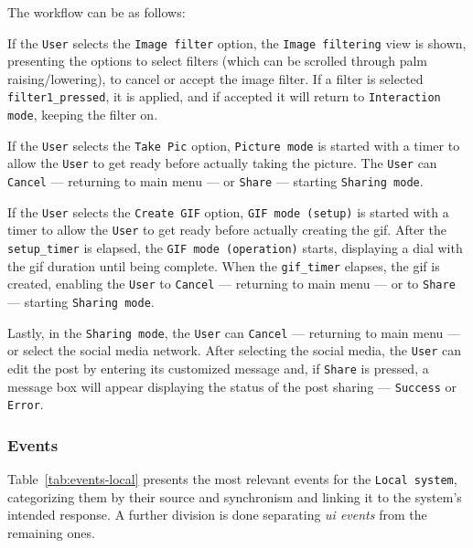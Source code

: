 The workflow can be as follows:
\begin{item-c}
\item If the \texttt{User} selects the \texttt{Image filter} option, the
  \texttt{Image filtering} view is shown, presenting the options to select
  filters (which can be scrolled through palm raising/lowering), to cancel or
  accept the image filter. If a filter is selected \texttt{filter1\_pressed}, it
  is applied, and if accepted it will return to \texttt{Interaction mode},
  keeping the filter on.
\item If the \texttt{User} selects the \texttt{Take Pic} option, \texttt{Picture
  mode} is started with a timer to allow the \texttt{User} to get ready before
actually taking the picture. The \texttt{User} can \texttt{Cancel} --- returning
to main menu --- or \texttt{Share} --- starting \texttt{Sharing mode}.
\item If the \texttt{User} selects the \texttt{Create GIF} option, \texttt{GIF
    mode (setup)} is started with a timer to allow the \texttt{User} to get
  ready before actually creating the \gls{gif}. After the \texttt{setup\_timer}
  is elapsed, the \texttt{GIF mode (operation)} starts, displaying a dial with
  the \gls{gif} duration until being complete. When the \texttt{gif\_timer}
  elapses, the \gls{gif} is created, enabling the \texttt{User} to
  \texttt{Cancel} --- returning to main menu --- or to \texttt{Share} ---
  starting \texttt{Sharing mode}.
\item Lastly, in the \texttt{Sharing mode}, the \texttt{User} can
  \texttt{Cancel} --- returning to main menu --- or select the
  social media network. After selecting the social media, the \texttt{User} can
  edit the post by entering its customized message and, if \texttt{Share} is
  pressed, a message box will appear displaying the status of the post sharing
  --- \texttt{Success} or \texttt{Error}.
\end{item-c}
%
\subsubsection{Events}%
\label{sec:events}
Table~\ref{tab:events-local} presents the most relevant events for the
\texttt{Local system}, categorizing them by their source and synchronism and
linking it to the system's intended response. A further division is done
separating \emph{\gls{ui} events} from the remaining ones.

